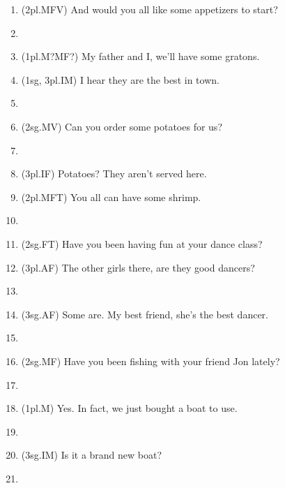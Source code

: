\begin{enumerate}
    \item (2pl.MFV) And would you all like some appetizers to start?
    \item[] \\
    \item (1pl.M?MF?) My father and I, we'll have some gratons.
    \item (1sg, 3pl.IM) I hear they are the best in town.
    \item[] \\
    \item (2sg.MV) Can you order some potatoes for us?
    \item[] \\
    \item (3pl.IF) Potatoes? They aren't served here.
    \item (2pl.MFT) You all can have some shrimp.
    \item[] \\
    \item (2sg.FT) Have you been having fun at your dance class?
    \item (3pl.AF) The other girls there, are they good dancers?
    \item[] \\
    \item (3sg.AF) Some are. My best friend, she's the best dancer.
    \item[] \\
    \item (2sg.MF) Have you been fishing with your friend Jon lately?
    \item[] \\
    \item (1pl.M) Yes. In fact, we just bought a boat to use.
    \item[] \\
    \item (3sg.IM) Is it a brand new boat?
    \item[] \\

\end{enumerate}
